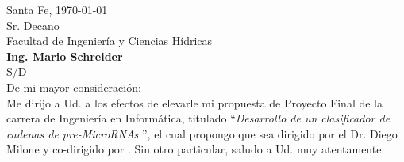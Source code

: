 \documentclass[a4paper,11pt,oneside]{article}
\begin{document}

Santa Fe, \today\\[2em]
%
Sr. Decano\\
Facultad de Ingeniería y Ciencias Hídricas\\
{\bfseries Ing. Mario Schreider}\\
S/D\\[2em]
%
De mi mayor consideración:\\[1em]
%
Me dirijo a Ud. a los efectos de elevarle mi propuesta de Proyecto
Final de la carrera de Ingeniería en Informática, titulado
``\emph{Desarrollo de un clasificador de cadenas de pre-MicroRNAs }'', el cual propongo
que sea dirigido por el Dr. Diego Milone y co-dirigido por
.
%
Sin otro particular, saludo a Ud. muy atentamente.\\[8em]
\hspace{12em}{\bfseries Mauro Torrez}\\
%
\end{document}
